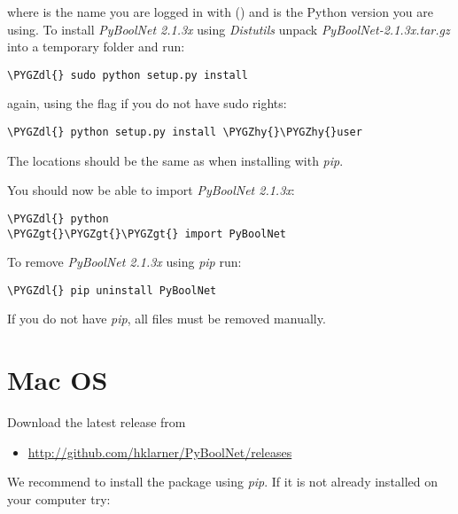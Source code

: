 \documentclass[letterpaper,10pt,english]{sphinxmanual}
\def\PYGZgt{\char`\>}
\def\PYGZdl{\char`\$}
\def\PYGZhy{\char`\-}
\begin{document}
where  is the name you are logged in with () and  is the Python version you are using.
To install \emph{PyBoolNet 2.1.3x} using \emph{Distutils} unpack \emph{PyBoolNet-2.1.3x.tar.gz} into a temporary folder and run:

\begin{Verbatim}[commandchars=\\\{\}]
\PYGZdl{} sudo python setup.py install
\end{Verbatim}

again, using the  flag if you do not have sudo rights:

\begin{Verbatim}[commandchars=\\\{\}]
\PYGZdl{} python setup.py install \PYGZhy{}\PYGZhy{}user
\end{Verbatim}

The locations should be the same as when installing with \emph{pip}.

You should now be able to import \emph{PyBoolNet 2.1.3x}:

\begin{Verbatim}[commandchars=\\\{\}]
\PYGZdl{} python
\PYGZgt{}\PYGZgt{}\PYGZgt{} import PyBoolNet
\end{Verbatim}

To remove \emph{PyBoolNet 2.1.3x} using \emph{pip} run:

\begin{Verbatim}[commandchars=\\\{\}]
\PYGZdl{} pip uninstall PyBoolNet
\end{Verbatim}

If you do not have \emph{pip}, all files must be removed manually.


\section{Mac OS}
\label{Installation:mac-os}
Download the latest release from
\begin{itemize}
\item {} 
\href{http://github.com/hklarner/PyBoolNet/releases}{http://github.com/hklarner/PyBoolNet/releases}

\end{itemize}

We recommend to install the package using \emph{pip}. If it is not already installed on your computer try:
\end{document}

